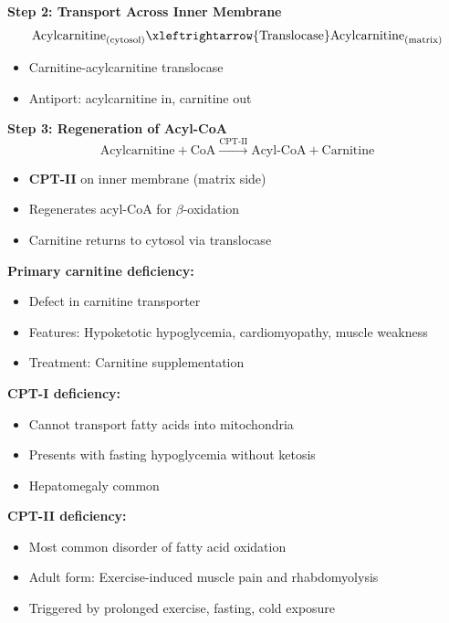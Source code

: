 \textbf{Step 2: Transport Across Inner Membrane}
\[
\text{Acylcarnitine}_{(\text{cytosol})} \xleftrightarrow{\text{Translocase}} \text{Acylcarnitine}_{(\text{matrix})}
\]
\begin{itemize}
    \item Carnitine-acylcarnitine translocase
    \item Antiport: acylcarnitine in, carnitine out
\end{itemize}

\textbf{Step 3: Regeneration of Acyl-CoA}
\[
\text{Acylcarnitine} + \text{CoA} \xrightarrow{\text{CPT-II}} \text{Acyl-CoA} + \text{Carnitine}
\]
\begin{itemize}
    \item \textbf{CPT-II} on inner membrane (matrix side)
    \item Regenerates acyl-CoA for $\beta$-oxidation
    \item Carnitine returns to cytosol via translocase
\end{itemize}

\begin{tcolorbox}[colback=red!5, colframe=red!70!black, title=\textbf{Clinical Correlation: Carnitine Deficiency}]
\textbf{Primary carnitine deficiency:}
\begin{itemize}
    \item Defect in carnitine transporter
    \item Features: Hypoketotic hypoglycemia, cardiomyopathy, muscle weakness
    \item Treatment: Carnitine supplementation
\end{itemize}

\textbf{CPT-I deficiency:}
\begin{itemize}
    \item Cannot transport fatty acids into mitochondria
    \item Presents with fasting hypoglycemia without ketosis
    \item Hepatomegaly common
\end{itemize}

\textbf{CPT-II deficiency:}
\begin{itemize}
    \item Most common disorder of fatty acid oxidation
    \item Adult form: Exercise-induced muscle pain and rhabdomyolysis
    \item Triggered by prolonged exercise, fasting, cold exposure
\end{itemize}
\end{tcolorbox}

